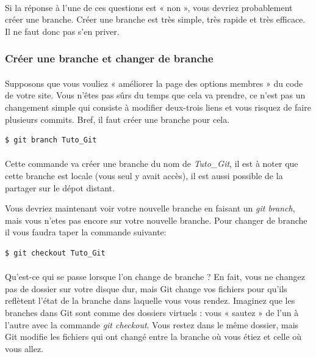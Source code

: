 \documentclass[french, a4paper, 12pt, titlepage]{article}
\begin{document}
\paragraph{}Si la réponse à l’une de ces questions est « non », vous devriez probablement créer une branche. Créer une branche est très simple, très rapide et très efficace. Il ne faut donc pas s’en priver.

\subsubsection{Créer une branche et changer de branche}
\paragraph{}Supposons que vous vouliez « améliorer la page des options membres » du code de votre site. Vous n’êtes pas sûrs du temps que cela va prendre, ce n’est pas un changement simple qui consiste à modifier deux-trois liens et vous risquez de faire plusieurs commits. Bref, il faut créer une branche pour cela.
\begin{lstlisting}
$ git branch Tuto_Git
\end{lstlisting}

\paragraph{}Cette commande va créer une branche du nom de \emph{Tuto\_Git}, il est à noter que cette branche est locale (vous seul y avait accès), il est aussi possible de la partager sur le dépot distant.

Vous devriez maintenant voir votre nouvelle branche en faisant un \emph{git branch}, mais vous n'etes pas encore sur votre nouvelle branche. Pour changer de branche il vous faudra taper la commande suivante:
\begin{lstlisting}
$ git checkout Tuto_Git
\end{lstlisting}

\paragraph{}Qu’est-ce qui se passe lorsque l’on change de branche ? En fait, vous ne changez pas de dossier sur votre disque dur, mais Git change vos fichiers pour qu’ils reflètent l’état de la branche dans laquelle vous vous rendez. Imaginez que les branches dans Git sont comme des dossiers virtuels : vous « sautez » de l’un à l’autre avec la commande \emph{git checkout}. Vous restez dans le même dossier, mais Git modifie les fichiers qui ont changé entre la branche où vous étiez et celle où vous allez.
\end{document}
